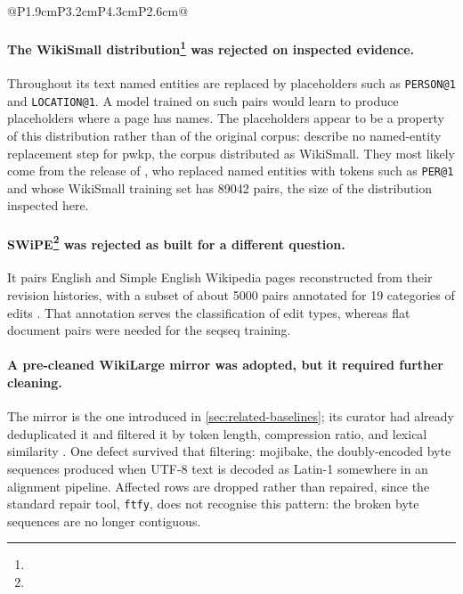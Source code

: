 \begin{table}[!tb]
\begin{tabular}{@{}P{1.9cm}P{3.2cm}P{4.3cm}P{2.6cm}@{}}
		\bottomrule
	\end{tabular}
\end{table}

\paragraph{The WikiSmall distribution\protect\footnote{} was rejected on inspected evidence.}
Throughout its text named entities are replaced by placeholders such as \texttt{PERSON@1} and \texttt{LOCATION@1}.
A model trained on such pairs would learn to produce placeholders where a page has names.
The placeholders appear to be a property of this distribution rather than of the original corpus: \textcite[1354]{zhu-etal-2010-monolingual} describe no named-entity replacement step for \gls{pwkp}, the corpus distributed as WikiSmall.
They most likely come from the release of \textcite[588--589]{zhang-lapata-2017-sentence}, who replaced named entities with tokens such as \texttt{PER@1} and whose WikiSmall training set has \num{89042} pairs, the size of the distribution inspected here.

\paragraph{SWiPE\protect\footnote{} was rejected as built for a different question.}
It pairs English and Simple English Wikipedia pages reconstructed from their revision histories, with a subset of about \num{5000} pairs annotated for 19 categories of edits \parencite[10674--10675]{laban-etal-2023-swipe}.
That annotation serves the classification of edit types, whereas flat document pairs were needed for the \gls{seqseq} training.

\pagebreak

\paragraph{A pre-cleaned WikiLarge mirror was adopted, but it required further cleaning.}
The mirror is the one introduced in \cref{sec:related-baselines}; its curator had already deduplicated it and filtered it by token length, compression ratio, and lexical similarity \parencite[3--4]{cohen2026simplify}.
One defect survived that filtering: mojibake, the doubly-encoded byte sequences produced when UTF-8 text is decoded as Latin-1 somewhere in an alignment pipeline.
Affected rows are dropped rather than repaired, since the standard repair tool, \texttt{ftfy}, does not recognise this pattern: the broken byte sequences are no longer contiguous.

